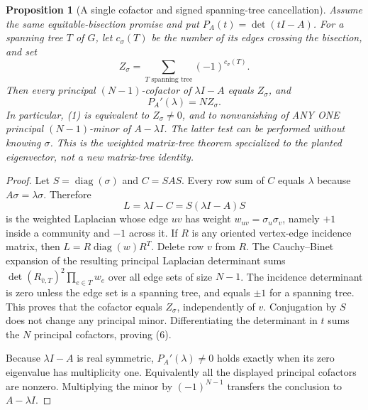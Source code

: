 \documentclass[11pt]{article}
\newtheorem{proposition}{Proposition}
\begin{document}
\begin{proposition}[A single cofactor and signed spanning-tree cancellation]
Assume the same equitable-bisection promise and put
$P_A(t)=\det(tI-A)$. For a spanning tree $T$ of $G$, let $c_\sigma(T)$
be the number of its edges crossing the bisection, and set
\[
 Z_\sigma=\sum_{T\text{ spanning tree}}(-1)^{c_\sigma(T)}.
\]
Then every principal $(N-1)$-cofactor of $\lambda I-A$ equals
$Z_\sigma$, and
\[
 P_A'(\lambda)=N Z_\sigma.                         \tag{6}
\]
In particular, (1) is equivalent to $Z_\sigma\ne0$, and to nonvanishing
of ANY ONE principal $(N-1)$-minor of $A-\lambda I$. The latter test
can be performed without knowing $\sigma$. This is the weighted
matrix-tree theorem specialized to the planted eigenvector, not a new
matrix-tree identity.
\end{proposition}
\begin{proof}
Let $S=\operatorname{diag}(\sigma)$ and $C=SAS$. Every row sum of $C$
equals $\lambda$ because $A\sigma=\lambda\sigma$. Therefore
\[
 L=\lambda I-C=S(\lambda I-A)S
\]
is the weighted Laplacian whose edge $uv$ has weight
$w_{uv}=\sigma_u\sigma_v$, namely $+1$ inside a community and $-1$
across it. If $R$ is any oriented vertex-edge incidence matrix, then
$L=R\operatorname{diag}(w)R^T$. Delete row $v$ from $R$. The
Cauchy--Binet expansion of the resulting principal Laplacian determinant
sums $\det(R_{\widehat v,T})^2\prod_{e\in T}w_e$ over all edge sets
of size $N-1$. The incidence determinant is zero unless the edge set
is a spanning tree, and equals $\pm1$ for a spanning tree. This proves
that the cofactor equals $Z_\sigma$, independently of $v$. Conjugation
by $S$ does not change any principal minor. Differentiating the
determinant in $t$ sums the $N$ principal cofactors, proving (6).

Because $\lambda I-A$ is real symmetric, $P_A'(\lambda)\ne0$ holds
exactly when its zero eigenvalue has multiplicity one. Equivalently all
the displayed principal cofactors are nonzero. Multiplying the minor by
$(-1)^{N-1}$ transfers the conclusion to $A-\lambda I$.
\end{proof}
\end{document}
